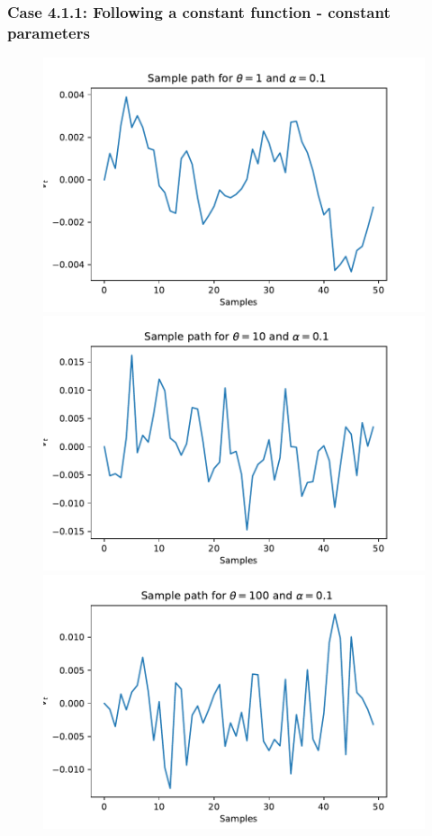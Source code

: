 \documentclass[aspectratio=169]{beamer}\usepackage[utf8]{inputenc}
\begin{document}
\begin{frame}\frametitle{ Case 4.1.1: Following a constant function - constant parameters }

\begin{figure}
    \includegraphics[scale=0.22]{Figures/sample_moments_constant_func_1_01.pdf}
    \includegraphics[scale=0.22]{Figures/sample_moments_constant_func_10_01.pdf}
      \includegraphics[scale=0.22]{Figures/sample_moments_constant_func_100_01.pdf}
      

\end{figure}
\end{frame}
\end{document}
